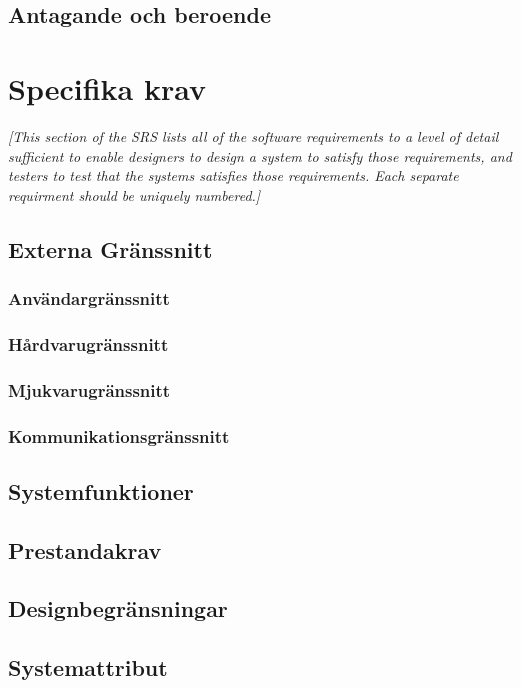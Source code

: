 \documentclass{article}
\begin{document}
\subsection{Antagande och beroende}


\section{Specifika krav}
\label{sec:specific}
\emph{[This section of the \ac{SRS} lists all of the software requirements to
  a level of detail sufficient to enable designers to design a system to
  satisfy those requirements, and testers to test that the systems satisfies
  those requirements. Each separate requirment should be uniquely numbered.]}

\subsection{Externa Gränssnitt}

\subsubsection{Användargränssnitt}
\subsubsection{Hårdvarugränssnitt}
\subsubsection{Mjukvarugränssnitt}
\subsubsection{Kommunikationsgränssnitt}
\subsection{Systemfunktioner}
\subsection{Prestandakrav}
\subsection{Designbegränsningar}
\subsection{Systemattribut}
\end{document}
